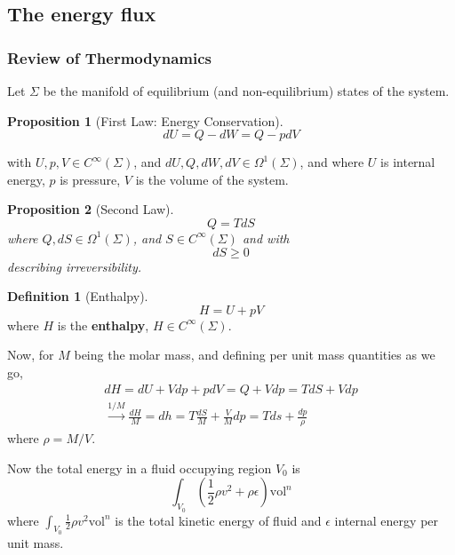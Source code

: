 \documentclass[twoside,landscape,10pt]{amsart}
\theoremstyle{plain}
\newtheorem{proposition}{Proposition}
\theoremstyle{definition}
\newtheorem{definition}{Definition}
\theoremstyle{remark}
\theoremstyle{remark}
\begin{document}
\begin{multicols*}{2}
\subsection*{The energy flux}

\subsubsection*{Review of Thermodynamics}

Let $\Sigma$ be the manifold of equilibrium (and non-equilibrium) states of the system.  

\begin{proposition}[First Law: Energy Conservation]
\begin{equation}
dU = Q - dW = Q - pdV
\end{equation}
\end{proposition}
with $U, p ,V \in C^{\infty}(\Sigma)$, and $dU, Q, dW , dV \in \Omega^1(\Sigma)$, and where $U$ is internal energy, $p$ is pressure, $V$ is the volume of the system.  

\begin{proposition}[Second Law]
\begin{equation}
  Q = TdS
\end{equation} where $Q, dS \in \Omega^1(\Sigma)$, and $S \in C^{\infty}(\Sigma)$ and
with 
\begin{equation}
  dS \geq 0
\end{equation} describing irreversibility.  
\end{proposition}

\begin{definition}[Enthalpy]
  \begin{equation}
    H = U + pV
\end{equation}
where $H$ is the \textbf{enthalpy}, $H \in C^{\infty}(\Sigma)$.  
\end{definition}

Now, for $M$ being the molar mass, and defining per unit mass quantities as we go,
\[
\begin{gathered}
  dH = dU + Vdp + pdV = Q + Vdp = TdS + Vdp \\
  \xrightarrow{ 1/M} \frac{dH}{M} = dh = T \frac{dS}{M} + \frac{V}{M} dp = Tds + \frac{dp}{\rho}
\end{gathered}
\]
where $\rho = M/V$.  

Now the total energy in a fluid occupying region $V_0$ is 
\[
\int_{V_0} \left( \frac{1}{2} \rho v^2 + \rho \epsilon \right)\text{vol}^n
\]
where $\int_{V_0} \frac{1}{2} \rho v^2 \text{vol}^n$ is the total kinetic energy of fluid and $\epsilon$ internal energy per unit mass.  


\end{multicols*}
\end{document}

